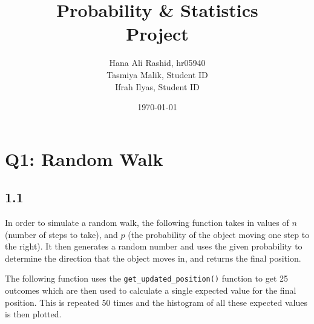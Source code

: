 \documentclass[answers]{exam}
\title{Probability \& Statistics\\ Project}
\author{Hana Ali Rashid, hr05940\\ Tasmiya Malik, Student ID\\ Ifrah Ilyas, Student ID}
\date{\today{}}
\begin{document}
\maketitle


\section*{Q1: Random Walk}
\subsection*{1.1}
In order to simulate a random walk, the following function takes in values of $n$ (number of steps to take), and $p$ (the probability of the object moving one step to the right). It then generates a random number and uses the given probability to determine the direction that the object moves in, and returns the final position.

The following function uses the \texttt{get\_updated\_position()} function to get 25 outcomes which are then used to calculate a single expected value for the final position. This is repeated 50 times and the histogram of all these expected values is then plotted.

\pagebreak
\end{document}
